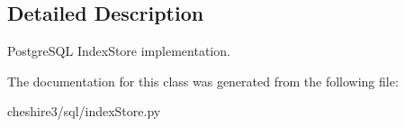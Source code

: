 \subsection{Detailed Description}
\begin{DoxyVerb}PostgreSQL IndexStore implementation.\end{DoxyVerb}
 

The documentation for this class was generated from the following file\-:\begin{DoxyCompactItemize}
\item 
cheshire3/sql/index\-Store.\-py\end{DoxyCompactItemize}
